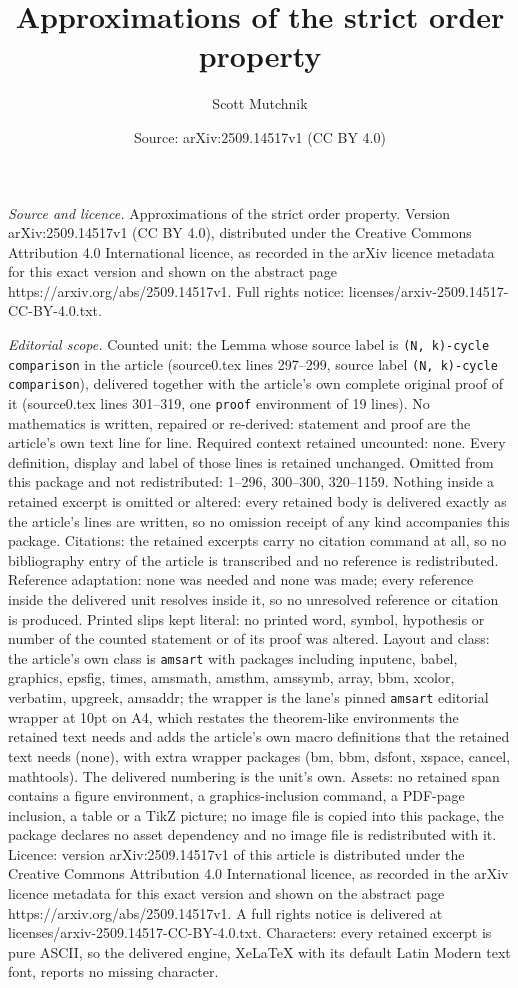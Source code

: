 \documentclass[10pt,a4paper]{amsart}
\title[Approximations of the strict order property]{Approximations of the strict order property}
\author{Scott Mutchnik}
\date{Source: arXiv:2509.14517v1 (CC BY 4.0)}
\begin{document}
\maketitle

\noindent\emph{Source and licence.} Approximations of the strict order property. Version arXiv:2509.14517v1 (CC BY 4.0), distributed under the Creative Commons Attribution 4.0 International licence, as recorded in the arXiv licence metadata for this exact version and shown on the abstract page https://arxiv.org/abs/2509.14517v1. Full rights notice: licenses/arxiv-2509.14517-CC-BY-4.0.txt.\par\smallskip

\noindent\textit{Editorial scope.} Counted unit: the Lemma whose source label is \texttt{(N, k)-cycle comparison} in the article (source0.tex lines 297--299, source label \texttt{(N, k)-cycle comparison}), delivered together with the article's own complete original proof of it (source0.tex lines 301--319, one \texttt{proof} environment of 19 lines). No mathematics is written, repaired or re-derived: statement and proof are the article's own text line for line. Required context retained uncounted: none. Every definition, display and label of those lines is retained unchanged. Omitted from this package and not redistributed: 1--296, 300--300, 320--1159. Nothing inside a retained excerpt is omitted or altered: every retained body is delivered exactly as the article's lines are written, so no omission receipt of any kind accompanies this package. Citations: the retained excerpts carry no citation command at all, so no bibliography entry of the article is transcribed and no reference is redistributed. Reference adaptation: none was needed and none was made; every reference inside the delivered unit resolves inside it, so no unresolved reference or citation is produced. Printed slips kept literal: no printed word, symbol, hypothesis or number of the counted statement or of its proof was altered. Layout and class: the article's own class is \texttt{amsart} with packages including inputenc, babel, graphics, epsfig, times, amsmath, amsthm, amssymb, array, bbm, xcolor, verbatim, upgreek, amsaddr; the wrapper is the lane's pinned \texttt{amsart} editorial wrapper at 10pt on A4, which restates the theorem-like environments the retained text needs and adds the article's own macro definitions that the retained text needs (none), with extra wrapper packages (bm, bbm, dsfont, xspace, cancel, mathtools). The delivered numbering is the unit's own. Assets: no retained span contains a figure environment, a graphics-inclusion command, a PDF-page inclusion, a table or a TikZ picture; no image file is copied into this package, the package declares no asset dependency and no image file is redistributed with it. Licence: version arXiv:2509.14517v1 of this article is distributed under the Creative Commons Attribution 4.0 International licence, as recorded in the arXiv licence metadata for this exact version and shown on the abstract page https://arxiv.org/abs/2509.14517v1. A full rights notice is delivered at licenses/arxiv-2509.14517-CC-BY-4.0.txt. Characters: every retained excerpt is pure ASCII, so the delivered engine, XeLaTeX with its default Latin Modern text font, reports no missing character.
\end{document}
